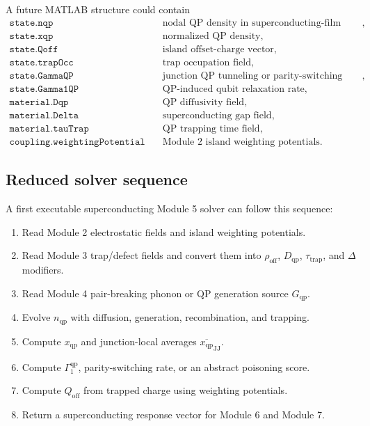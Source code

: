 \documentclass[11pt]{article}
\newcommand{\nqp}{n_{\mathrm{qp}}}
\newcommand{\xqp}{x_{\mathrm{qp}}}
\newcommand{\Dqp}{D_{\mathrm{qp}}}
\newcommand{\Gqp}{G_{\mathrm{qp}}}
\newcommand{\tautrap}{\tau_{\mathrm{trap}}}
\newcommand{\Qoff}{Q_{\mathrm{off}}}
\newcommand{\rhooff}{\rho_{\mathrm{off}}}
\begin{document}
A future MATLAB structure could contain
\begin{align}
\texttt{state.nqp} &\quad \text{nodal QP density in superconducting-film mesh},\\
\texttt{state.xqp} &\quad \text{normalized QP density},\\
\texttt{state.Qoff} &\quad \text{island offset-charge vector},\\
\texttt{state.trapOcc} &\quad \text{trap occupation field},\\
\texttt{state.GammaQP} &\quad \text{junction QP tunneling or parity-switching rate},\\
\texttt{state.Gamma1QP} &\quad \text{QP-induced qubit relaxation rate},\\
\texttt{material.Dqp} &\quad \text{QP diffusivity field},\\
\texttt{material.Delta} &\quad \text{superconducting gap field},\\
\texttt{material.tauTrap} &\quad \text{QP trapping time field},\\
\texttt{coupling.weightingPotential} &\quad \text{Module 2 island weighting potentials}.
\end{align}

\subsection{Reduced solver sequence}

A first executable superconducting Module 5 solver can follow this sequence:
\begin{enumerate}[leftmargin=2em]
\item Read Module 2 electrostatic fields and island weighting potentials.
\item Read Module 3 trap/defect fields and convert them into \(\rhooff\), \(\Dqp\), \(\tautrap\), and \(\Delta\) modifiers.
\item Read Module 4 pair-breaking phonon or QP generation source \(\Gqp\).
\item Evolve \(\nqp\) with diffusion, generation, recombination, and trapping.
\item Compute \(\xqp\) and junction-local averages \(\overline{\xqp}_{\mathrm{JJ}}\).
\item Compute \(\Gamma_1^{\mathrm{qp}}\), parity-switching rate, or an abstract poisoning score.
\item Compute \(\Qoff\) from trapped charge using weighting potentials.
\item Return a superconducting response vector for Module 6 and Module 7.
\end{enumerate}
\end{document}
